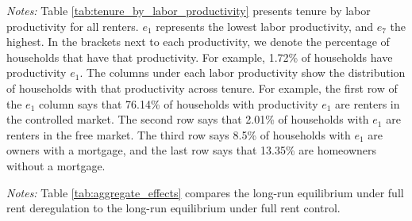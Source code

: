\documentclass[parskip=full]{article}
\newenvironment{fignote2}[1]
{
\par
\medskip
\begin{minipage}{#1}
\footnotesize
}
{
\end{minipage}
}
\begin{document}
\begin{table}[H]
    \centering
    \caption{Tenure by labor productivity for all households in benchmark}
    \vspace{-0.5cm}
    \label{tab:tenure_by_labor_productivity}
    
    \vspace{-0.45cm}
    \begin{fignote2}{0.97\textwidth}
      \textit{Notes:} Table \ref{tab:tenure_by_labor_productivity} presents tenure by labor  productivity for all renters. $e_{1}$ represents the lowest labor productivity, and $e_{7}$ the highest. In the brackets next to each productivity, we denote the percentage of households that have that productivity. For example, 1.72\% of households have productivity $e_{1}$. The columns under each labor productivity show the distribution of households with that productivity across tenure. For example, the first row of the $e_{1}$ column says that 76.14\% of households with productivity $e_{1}$ are renters in the controlled market. The second row says that 2.01\% of households with $e_{1}$ are renters in the free market. The third row says 8.5\% of households with $e_{1}$ are owners with a mortgage, and the last row says that 13.35\% are homeowners without a mortgage.
    \end{fignote2}
\end{table}

\begin{table}[H]
    \centering
    \caption{Aggregate effects}
    \vspace{-0.5cm}
    \label{tab:aggregate_effects}
    
    \vspace{-0.45cm}
    \begin{fignote2}{0.74\textwidth}
      \textit{Notes:} Table \ref{tab:aggregate_effects} compares the long-run equilibrium under full rent deregulation to the long-run equilibrium under full rent control.        
    \end{fignote2}
\end{table}
\end{document}
